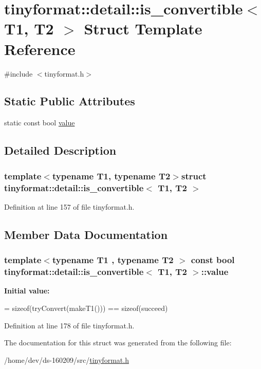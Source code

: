 \hypertarget{structtinyformat_1_1detail_1_1is__convertible}{}\section{tinyformat\+:\+:detail\+:\+:is\+\_\+convertible$<$ T1, T2 $>$ Struct Template Reference}
\label{structtinyformat_1_1detail_1_1is__convertible}


{\ttfamily \#include $<$tinyformat.\+h$>$}

\subsection*{Static Public Attributes}
\begin{DoxyCompactItemize}
\item 
static const bool \hyperlink{structtinyformat_1_1detail_1_1is__convertible_a399ca4333bd68f88a5d5a2430f804df2}{value}
\end{DoxyCompactItemize}


\subsection{Detailed Description}
\subsubsection*{template$<$typename T1, typename T2$>$struct tinyformat\+::detail\+::is\+\_\+convertible$<$ T1, T2 $>$}



Definition at line 157 of file tinyformat.\+h.



\subsection{Member Data Documentation}
\hypertarget{structtinyformat_1_1detail_1_1is__convertible_a399ca4333bd68f88a5d5a2430f804df2}{}
\subsubsection[{value}]{\setlength{\rightskip}{0pt plus 5cm}template$<$typename T1 , typename T2 $>$ const bool {\bf tinyformat\+::detail\+::is\+\_\+convertible}$<$ T1, T2 $>$\+::value\hspace{0.3cm}{\ttfamily [static]}}\label{structtinyformat_1_1detail_1_1is__convertible_a399ca4333bd68f88a5d5a2430f804df2}
{\bfseries Initial value\+:}
\begin{DoxyCode}
=
            \textcolor{keyword}{sizeof}(tryConvert(makeT1())) == \textcolor{keyword}{sizeof}(succeed)
\end{DoxyCode}


Definition at line 178 of file tinyformat.\+h.



The documentation for this struct was generated from the following file\+:\begin{DoxyCompactItemize}
\item 
/home/dev/ds-\/160209/src/\hyperlink{tinyformat_8h}{tinyformat.\+h}\end{DoxyCompactItemize}
